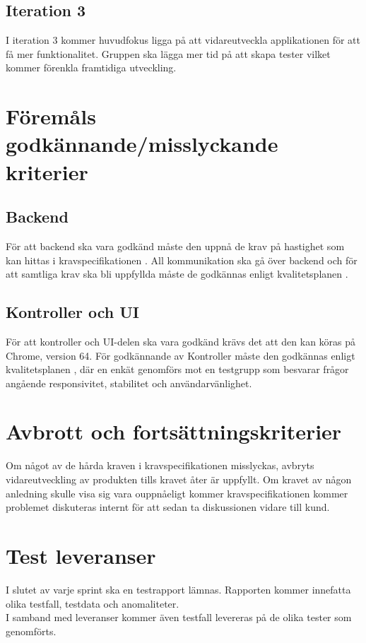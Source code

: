 \documentclass[10pt]{article}
\begin{document}
\subsection{Iteration 3}
	I iteration 3 kommer huvudfokus ligga på att vidareutveckla applikationen för att få mer funktionalitet. Gruppen ska lägga mer tid på att skapa tester vilket kommer förenkla framtidiga utveckling. 
	
	
	

\section{Föremåls godkännande/misslyckande kriterier}
	\subsection{Backend}
		För att backend ska vara godkänd måste den uppnå de krav på hastighet som kan hittas i kravspecifikationen \cite{bib-kravspec}. All kommunikation ska gå över backend och för att samtliga krav ska bli uppfyllda måste de godkännas enligt kvalitetsplanen  \cite{bib-kvalitetsplan}.

	\subsection{Kontroller och UI}
		För att kontroller och UI-delen ska vara godkänd krävs det att den kan köras på Chrome, version 64. För godkännande av Kontroller måste den godkännas enligt kvalitetsplanen \cite{bib-kvalitetsplan}, där en enkät genomförs mot en testgrupp som besvarar frågor angående responsivitet, stabilitet och användarvänlighet.



\section{Avbrott och fortsättningskriterier}
	Om något av de hårda kraven i kravspecifikationen \cite{bib-kravspec} misslyckas, avbryts vidareutveckling av produkten tills kravet åter är uppfyllt. Om kravet av någon anledning skulle visa sig vara ouppnåeligt kommer kravspecifikationen kommer problemet diskuteras internt för att sedan ta diskussionen vidare till kund. 



\section{Test leveranser}
	I slutet av varje sprint ska en testrapport lämnas. Rapporten kommer innefatta olika testfall, testdata och anomaliteter.
	\\
	I samband med leveranser kommer även testfall levereras på de olika tester som genomförts. 
\end{document}
